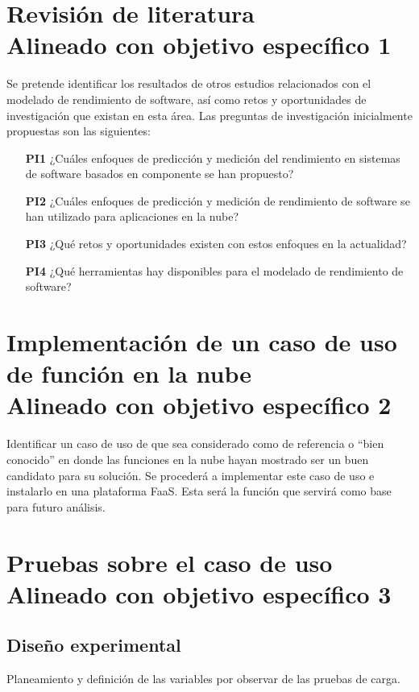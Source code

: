 ﻿\section[Revisión de literatura]{Revisión de literatura\\\small{Alineado con objetivo específico 1}}
Se pretende identificar los resultados de otros estudios relacionados con el modelado de rendimiento de software, así como retos y oportunidades de investigación que existan en esta área. Las preguntas de investigación inicialmente propuestas son las siguientes:
\begin{itemize}
    \item[\textbf{PI1}] ¿Cuáles enfoques de predicción y medición del rendimiento en sistemas de software basados en componente se han propuesto?
    \item[\textbf{PI2}] ¿Cuáles enfoques de predicción y medición de rendimiento de software se han utilizado para aplicaciones en la nube?
    \item[\textbf{PI3}] ¿Qué retos y oportunidades existen con estos enfoques en la actualidad?
    \item[\textbf{PI4}] ¿Qué herramientas hay disponibles para el modelado de rendimiento de software?
\end{itemize}

\section[Implementación de caso de uso de función en la nube]{Implementación de un caso de uso de función en la nube\\\small{Alineado con objetivo específico 2}}

Identificar un caso de uso de que sea considerado como de referencia o ``bien conocido'' en donde las funciones en la nube hayan mostrado ser un buen candidato para su solución. Se procederá a implementar este caso de uso e instalarlo en una plataforma FaaS. Esta será la función que servirá como base para futuro análisis.

\section[Pruebas sobre el caso de uso]{Pruebas sobre el caso de uso\\\small{Alineado con objetivo específico 3}}

\subsection{Diseño experimental}
Planeamiento y definición de las variables por observar de las pruebas de carga.

